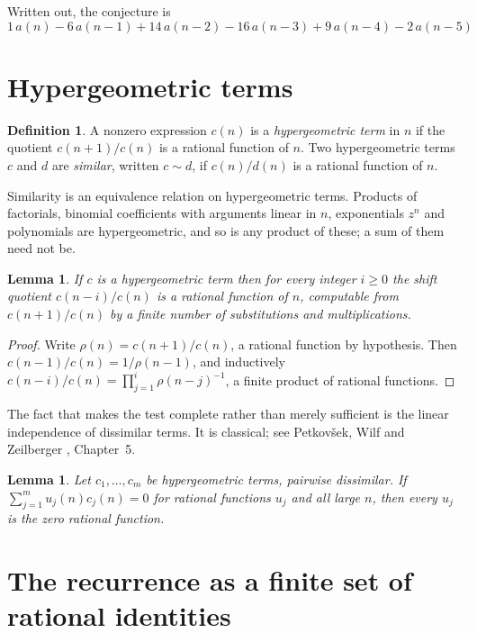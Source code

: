 \documentclass[11pt,a4paper]{article}
\theoremstyle{plain}
\newtheorem{lemma}[theorem]{Lemma}
\theoremstyle{definition}
\newtheorem{definition}[theorem]{Definition}
\begin{document}
Written out, the conjecture is
\begin{equation}\label{eq:conj}
1\,a(n) - 6\,a(n-1) + 14\,a(n-2) - 16\,a(n-3) + 9\,a(n-4) - 2\,a(n-5)
\end{equation}

\section{Hypergeometric terms}

\begin{definition}
A nonzero expression $c(n)$ is a \emph{hypergeometric term} in $n$ if the quotient
$c(n+1)/c(n)$ is a rational function of $n$. Two hypergeometric terms $c$ and $d$ are
\emph{similar}, written $c\sim d$, if $c(n)/d(n)$ is a rational function of $n$.
\end{definition}

Similarity is an equivalence relation on hypergeometric terms. Products of factorials,
binomial coefficients with arguments linear in $n$, exponentials $z^{n}$ and polynomials
are hypergeometric, and so is any product of these; a sum of them need not be.

\begin{lemma}\label{lem:shift}
If $c$ is a hypergeometric term then for every integer $i\ge 0$ the shift quotient
$c(n-i)/c(n)$ is a rational function of $n$, computable from $c(n+1)/c(n)$ by a finite
number of substitutions and multiplications.
\end{lemma}

\begin{proof}
Write $\rho(n)=c(n+1)/c(n)$, a rational function by hypothesis. Then
$c(n-1)/c(n)=1/\rho(n-1)$, and inductively
$c(n-i)/c(n)=\prod_{j=1}^{i}\rho(n-j)^{-1}$, a finite product of rational functions.
\end{proof}

The fact that makes the test complete rather than merely sufficient is the linear
independence of dissimilar terms. It is classical; see Petkov\v{s}ek, Wilf and Zeilberger
\cite{AB}, Chapter~5.

\begin{lemma}\label{lem:indep}
Let $c_{1},\dots,c_{m}$ be hypergeometric terms, pairwise dissimilar. If
$\sum_{j=1}^{m}u_{j}(n)c_{j}(n)=0$ for rational functions $u_{j}$ and all large $n$, then
every $u_{j}$ is the zero rational function.
\end{lemma}

\section{The recurrence as a finite set of rational identities}
\end{document}

